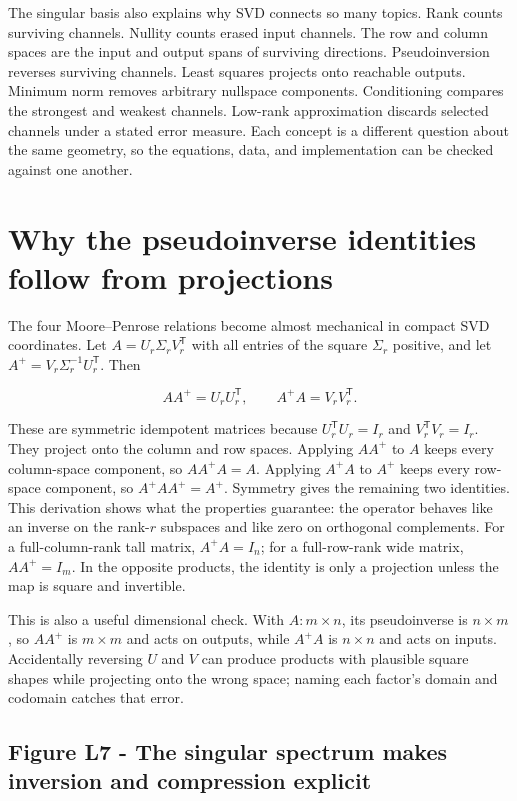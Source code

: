 The singular basis also explains why SVD connects so many topics. Rank counts surviving channels. Nullity counts erased input channels. The row and column spaces are the input and output spans of surviving directions. Pseudoinversion reverses surviving channels. Least squares projects onto reachable outputs. Minimum norm removes arbitrary nullspace components. Conditioning compares the strongest and weakest channels. Low-rank approximation discards selected channels under a stated error measure. Each concept is a different question about the same geometry, so the equations, data, and implementation can be checked against one another.

\section{Why the pseudoinverse identities follow from projections}\label{02-foundations-ii-ch024-why-the-pseudoinverse-identities-follow-from-projections}

The four Moore--Penrose relations become almost mechanical in compact SVD coordinates. Let \(A=U_r\Sigma_rV_r^\mathsf T\) with all entries of the square \(\Sigma_r\) positive, and let \(A^+=V_r\Sigma_r^{-1}U_r^\mathsf T\). Then

\[
AA^+=U_rU_r^\mathsf T,\qquad A^+A=V_rV_r^\mathsf T.
\]

These are symmetric idempotent matrices because \(U_r^\mathsf T U_r=I_r\) and \(V_r^\mathsf T V_r=I_r\). They project onto the column and row spaces. Applying \(AA^+\) to \(A\) keeps every column-space component, so \(AA^+A=A\). Applying \(A^+A\) to \(A^+\) keeps every row-space component, so \(A^+AA^+=A^+\). Symmetry gives the remaining two identities. This derivation shows what the properties guarantee: the operator behaves like an inverse on the rank-\(r\) subspaces and like zero on orthogonal complements. For a full-column-rank tall matrix, \(A^+A=I_n\); for a full-row-rank wide matrix, \(AA^+=I_m\). In the opposite products, the identity is only a projection unless the map is square and invertible.

This is also a useful dimensional check. With \(A:m\times n\), its pseudoinverse is \(n\times m\), so \(AA^+\) is \(m\times m\) and acts on outputs, while \(A^+A\) is \(n\times n\) and acts on inputs. Accidentally reversing \(U\) and \(V\) can produce products with plausible square shapes while projecting onto the wrong space; naming each factor's domain and codomain catches that error.

\subsection{Figure L7 - The singular spectrum makes inversion and compression explicit}\label{02-foundations-ii-ch024-figure-l7---the-singular-spectrum-makes-inversion-and-compression-explicit}

